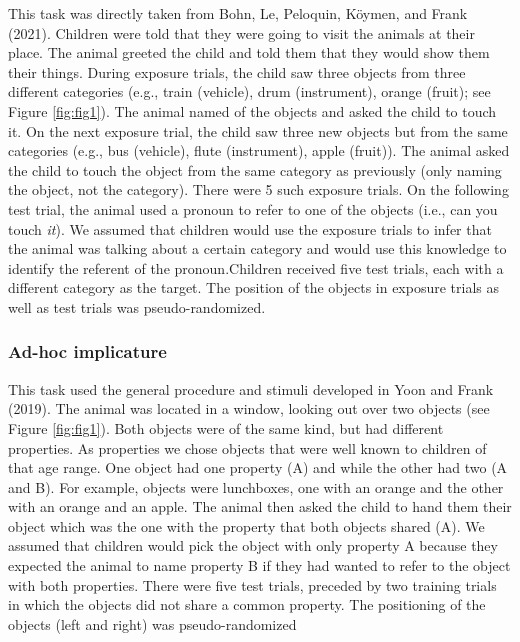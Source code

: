 \documentclass[
  english,
  man,floatsintext]{apa6}
\begin{document}
This task was directly taken from Bohn, Le, Peloquin, Köymen, and Frank (2021). Children were told that they were going to visit the animals at their place. The animal greeted the child and told them that they would show them their things. During exposure trials, the child saw three objects from three different categories (e.g., train (vehicle), drum (instrument), orange (fruit); see Figure \ref{fig:fig1}). The animal named of the objects and asked the child to touch it. On the next exposure trial, the child saw three new objects but from the same categories (e.g., bus (vehicle), flute (instrument), apple (fruit)). The animal asked the child to touch the object from the same category as previously (only naming the object, not the category). There were 5 such exposure trials. On the following test trial, the animal used a pronoun to refer to one of the objects (i.e., can you touch \emph{it}). We assumed that children would use the exposure trials to infer that the animal was talking about a certain category and would use this knowledge to identify the referent of the pronoun.Children received five test trials, each with a different category as the target. The position of the objects in exposure trials as well as test trials was pseudo-randomized.

\hypertarget{ad-hoc-implicature}{%
\subsubsection{Ad-hoc implicature}\label{ad-hoc-implicature}}

This task used the general procedure and stimuli developed in Yoon and Frank (2019). The animal was located in a window, looking out over two objects (see Figure \ref{fig:fig1}). Both objects were of the same kind, but had different properties. As properties we chose objects that were well known to children of that age range. One object had one property (A) and while the other had two (A and B). For example, objects were lunchboxes, one with an orange and the other with an orange and an apple. The animal then asked the child to hand them their object which was the one with the property that both objects shared (A). We assumed that children would pick the object with only property A because they expected the animal to name property B if they had wanted to refer to the object with both properties. There were five test trials, preceded by two training trials in which the objects did not share a common property. The positioning of the objects (left and right) was pseudo-randomized
\end{document}
